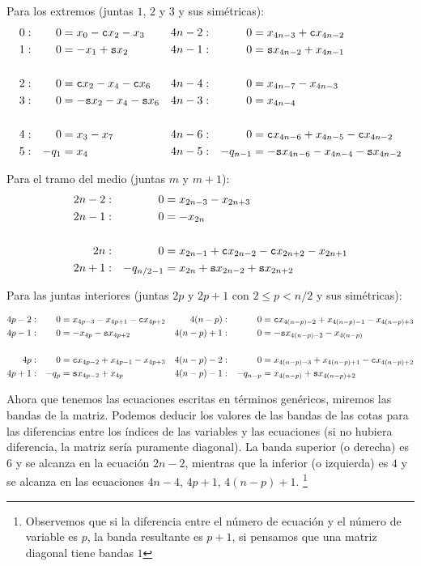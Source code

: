 Para los extremos (juntas $1$, $2$ y $3$ y sus simétricas):
\begin{align*}
	0:& & 0 &= x_0 - \mathtt{c} x_2 - x_3   & 4n-2: & & 0 &=   x_{4n-3}+ \mathtt{c} x_{4n-2} \\
	1:& & 0 &= - x_1 + \mathtt{s} x_2   & 4n-1: & & 0 &= \mathtt{s} x_{4n-2}  + x_{4n-1} \\
	\\
	2: & & 0 &=  \mathtt{c} x_2 - x_4 - \mathtt{c} x_6  &  4n-4: & &0 &= x_{4n-7} - x_{4n-3} \\
	3: & & 0 &= - \mathtt{s} x_2 -  x_4 - \mathtt{s} x_6 & 4n-3: & & 0 &= x_{4n-4}   \\
	\\
	4: & & 0 &=  x_3 - x_7  & 4n-6: && 0&=  \mathtt{c} x_{4n-6} + x_{4n-5} - \mathtt{c} x_{4n-2}\\
	5: & & -q_1 &= x_4 &  4n-5: && -q_{n-1} &= -\mathtt{s} x_{4n-6} - x_{4n-4} - \mathtt{s} x_{4n-2}
\end{align*}

Para el tramo del medio (juntas $m$ y $m+1$):
\begin{align*}
2n-2:& & 0 &= x_{2n-3} - x_{2n+3}  \\
2n-1:& & 0 &= -x_{2n}  \\
\\
2n: & & 0 &= x_{2n-1} + \mathtt{c} x_{2n-2} - \mathtt{c} x_{2n+2} - x_{2n+1}   \\
2n+1: & & -q_{n/2 -1} &= x_{2n} + \mathtt{s} x_{2n-2} + \mathtt{s} x_{2n+2}   
\end{align*}

Para las juntas interiores (juntas $2p$ y $2p+1$ con $2 \leq p < n/2$ y sus simétricas):

\begin{align*}
4p-2: & & 0 &=x_{4p-3} - x_{4p+1} - \mathtt{c} x_{4p+2} & 4(n-p): & & 0 &= \mathtt{c} x_{4(n-p)-2} + x_{4(n-p)-1} -  x_{4(n-p)+3}\\
4p-1: & &0 &= -x_{4p} - \mathtt{s} x_{4p+2} & 4(n-p)+1: & & 0 &= -\mathtt{s} x_{4(n-p)-2} - x_{4(n-p)} \\
\\
4p: & & 0 &= \mathtt{c} x_{4p-2}  + x_{4p-1} - x_{4p+3}  & 4(n-p)-2: & & 0 &= x_{4(n-p)-3} + x_{4(n-p)+1} - \mathtt{c} x_{4(n-p)+2} \\
4p+1: & &-q_{p} &= \mathtt{s} x_{4p-2} +x_{4p} & 4(n-p)-1: & & -q_{n-p} &= x_{4(n-p)} + \mathtt{s} x_{4(n-p)+2} \\
\end{align*}

Ahora que tenemos las ecuaciones escritas en términos genéricos, miremos las bandas de la matriz. Podemos deducir los valores de las bandas de las cotas para las diferencias entre los índices de las variables y las ecuaciones (si no hubiera diferencia, la matriz sería puramente diagonal). La banda superior (o derecha) es $6$ y se alcanza en la ecuación $2n-2$, mientras que la inferior (o izquierda) es $4$ y se alcanza en las ecuaciones $4n-4$, $4p+1$, $4(n-p)+1$. \footnote{Observemos que si la diferencia entre el número de ecuación y el número de variable es $p$, la banda resultante es $p+1$, si pensamos que una matriz diagonal tiene bandas $1$}



